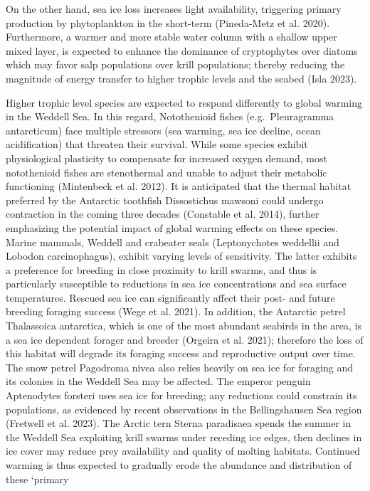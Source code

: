 \documentclass[
]{article}
\begin{document}
On the other hand, sea ice loss increases light availability, triggering
primary production by phytoplankton in the short-term (Pineda-Metz et
al. 2020). Furthermore, a warmer and more stable water column with a
shallow upper mixed layer, is expected to enhance the dominance of
cryptophytes over diatoms which may favor salp populations over krill
populations; thereby reducing the magnitude of energy transfer to higher
trophic levels and the seabed (Isla 2023).

Higher trophic level species are expected to respond differently to
global warming in the Weddell Sea. In this regard, Notothenioid fishes
(e.g.~Pleuragramma antarcticum) face multiple stressors (sea warming,
sea ice decline, ocean acidification) that threaten their survival.
While some species exhibit physiological plasticity to compensate for
increased oxygen demand, most notothenioid fishes are stenothermal and
unable to adjust their metabolic functioning (Mintenbeck et al. 2012).
It is anticipated that the thermal habitat preferred by the Antarctic
toothfish Dissostichus mawsoni could undergo contraction in the coming
three decades (Constable et al. 2014), further emphasizing the potential
impact of global warming effects on these species. Marine mammals,
Weddell and crabeater seals (Leptonychotes weddellii and Lobodon
carcinophagus), exhibit varying levels of sensitivity. The latter
exhibits a preference for breeding in close proximity to krill swarms,
and thus is particularly susceptible to reductions in sea ice
concentrations and sea surface temperatures. Rescued sea ice can
significantly affect their post- and future breeding foraging success
(Wege et al. 2021). In addition, the Antarctic petrel Thalassoica
antarctica, which is one of the most abundant seabirds in the area, is a
sea ice dependent forager and breeder (Orgeira et al. 2021); therefore
the loss of this habitat will degrade its foraging success and
reproductive output over time. The snow petrel Pagodroma nivea also
relies heavily on sea ice for foraging and its colonies in the Weddell
Sea may be affected. The emperor penguin Aptenodytes forsteri uses sea
ice for breeding; any reductions could constrain its populations, as
evidenced by recent observations in the Bellingshausen Sea region
(Fretwell et al. 2023). The Arctic tern Sterna paradisaea spends the
summer in the Weddell Sea exploiting krill swarms under receding ice
edges, then declines in ice cover may reduce prey availability and
quality of molting habitats. Continued warming is thus expected to
gradually erode the abundance and distribution of these `primary
\end{document}
